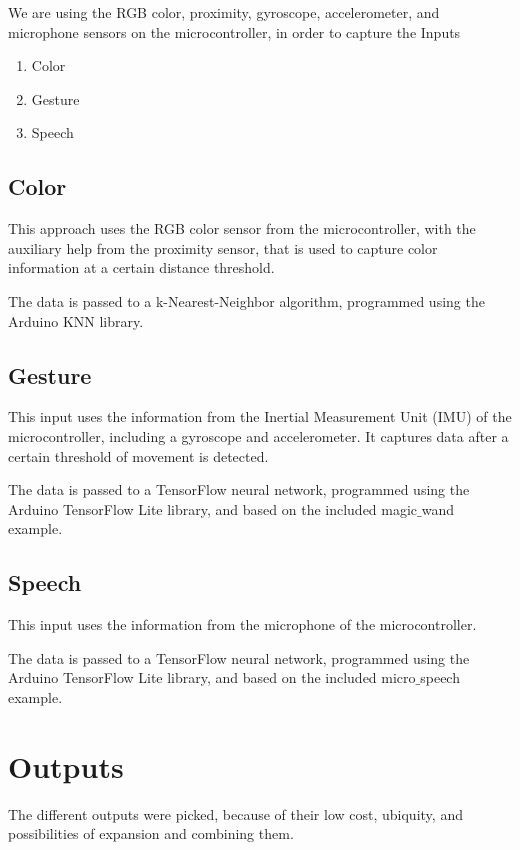 We are using the RGB color, proximity, gyroscope, accelerometer, and microphone sensors on the microcontroller, in order to capture the Inputs

\begin{enumerate}
  \item Color
  \item Gesture
  \item Speech
\end{enumerate}

\subsection{Color}

This approach uses the RGB color sensor from the microcontroller, with the auxiliary help from the proximity sensor, that is used to capture color information at a certain distance threshold.

The data is passed to a k-Nearest-Neighbor algorithm, programmed using the Arduino KNN library.

\subsection{Gesture}

This input uses the information from the Inertial Measurement Unit (IMU) of the microcontroller, including a gyroscope and accelerometer. It captures data after a certain threshold of movement is detected.

The data is passed to a TensorFlow neural network, programmed using the Arduino TensorFlow Lite library, and based on the included magic$\_$wand example.

\subsection{Speech}

This input uses the information from the microphone of the microcontroller.

The data is passed to a TensorFlow neural network, programmed using the Arduino TensorFlow Lite library, and based on the included micro$\_$speech example.

\section{Outputs}

The different outputs were picked, because of their low cost, ubiquity, and possibilities of expansion and combining them.


